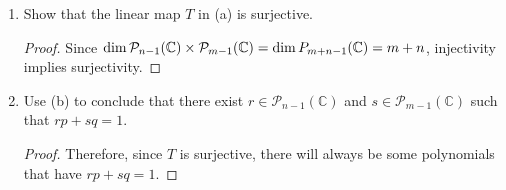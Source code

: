 \begin{enumerate}
\begin{enumerate}
\begin{proof}
            We know that $r_1 - r_2 \ne 0$ and $s_2 - s_1 \ne 0$. 

            But this means that any zero of $p$ is also a zero of $q$, and since $p$ is non-constant, there will always be at least one such zero. However, $p$ and $q$ have no zeroes in common, so we have a contradiction!
        \end{proof}
        
        \item Show that the linear map $T$ in (a) is surjective.
        
        \begin{proof}
            Since $\dim \mathcal P_{n-1}(\mathbb{C}) \times \mathcal P_{m-1}(\mathbb{C}) = \dim P_{m + n - 1}(\mathbb{C}) = m + n$, injectivity implies surjectivity.
        \end{proof}
        
        \item Use (b) to conclude that there exist $r \in \mathcal{P}_{n-1}(\mathbb{C})$ and $s \in \mathcal{P}_{m-1}(\mathbb{C})$ such
        that $rp + sq = 1$.

        \begin{proof}
            Therefore, since $T$ is surjective, there will always be some polynomials that have $rp + sq = 1$.
        \end{proof}
    \end{enumerate}
\end{enumerate}